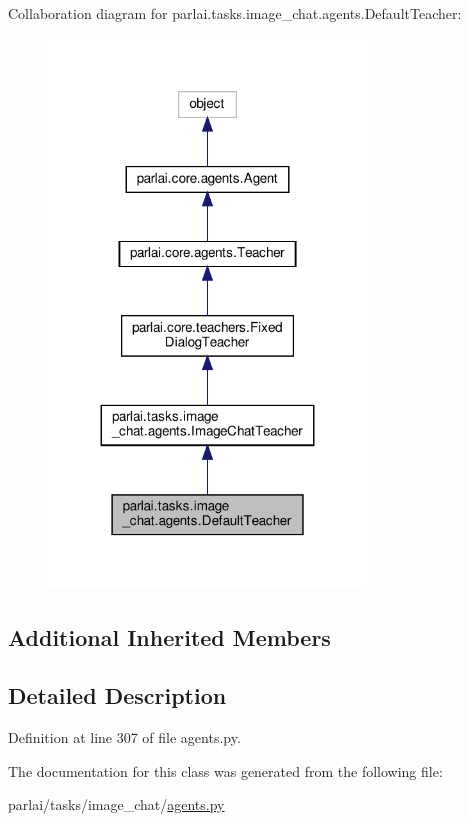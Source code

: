 Collaboration diagram for parlai.\+tasks.\+image\+\_\+chat.\+agents.\+Default\+Teacher\+:
\nopagebreak
\begin{figure}[H]
\begin{center}
\leavevmode
\includegraphics[width=239pt]{classparlai_1_1tasks_1_1image__chat_1_1agents_1_1DefaultTeacher__coll__graph}
\end{center}
\end{figure}
\subsection*{Additional Inherited Members}


\subsection{Detailed Description}


Definition at line 307 of file agents.\+py.



The documentation for this class was generated from the following file\+:\begin{DoxyCompactItemize}
\item 
parlai/tasks/image\+\_\+chat/\hyperlink{parlai_2tasks_2image__chat_2agents_8py}{agents.\+py}\end{DoxyCompactItemize}
